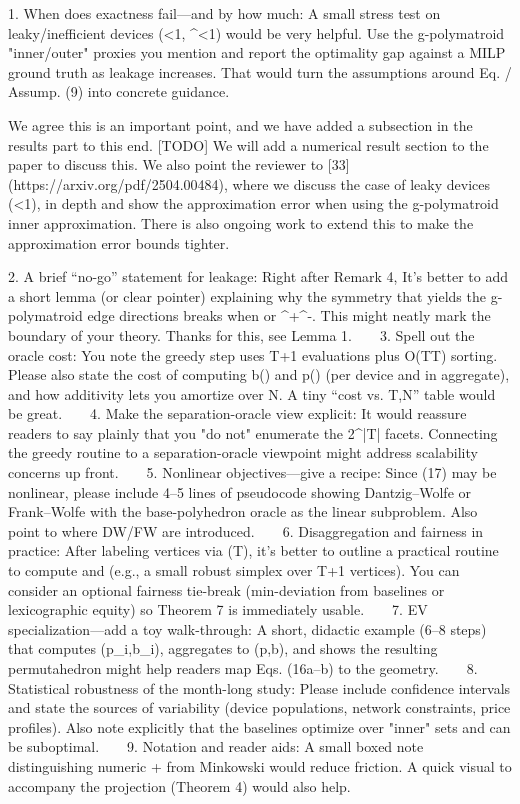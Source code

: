 1. When does exactness fail—and by how much: A small stress test on leaky/inefficient devices (\lambda<1, \eta^\pm<1) would be very helpful. Use the g-polymatroid "inner/outer" proxies you mention and report the optimality gap against a MILP ground truth as leakage increases. That would turn the assumptions around Eq. / Assump. (9) into concrete guidance.

We agree this is an important point, and we have added a subsection in the results part to this end. 
[TODO] We will add a numerical result section to the paper to discuss this.
We also point the reviewer to [33] (https://arxiv.org/pdf/2504.00484), where we discuss the case of leaky devices (\lambda<1), in depth and show the approximation error when using the g-polymatroid inner approximation. There is also ongoing work to extend this to make the approximation error bounds tighter.

2. A brief “no-go” statement for leakage: Right after Remark 4, It's better to add a short lemma (or clear pointer) explaining why the symmetry that yields the g-polymatroid edge directions breaks when \lambda{} or \eta^+\neq\eta^-. This might neatly mark the boundary of your theory.
Thanks for this, see Lemma 1.
   
3. Spell out the oracle cost: You note the greedy step uses T{+}1 evaluations plus O(T\log T) sorting. Please also state the cost of computing b(\cdot) and p(\cdot) (per device and in aggregate), and how additivity lets you amortize over N. A tiny “cost vs. T,N” table would be great.
   
4. Make the separation-oracle view explicit: It would reassure readers to say plainly that you "do not" enumerate the 2^{|T|} facets. Connecting the greedy routine to a separation-oracle viewpoint might address scalability concerns up front.
   
5. Nonlinear objectives—give a recipe: Since (17) may be nonlinear, please include 4–5 lines of pseudocode showing Dantzig–Wolfe or Frank–Wolfe with the base-polyhedron oracle as the linear subproblem. Also point to where DW/FW are introduced.
   
6. Disaggregation and fairness in practice: After labeling vertices via (\tilde T), it's better to outline a practical routine to compute \lambda and \Pi (e.g., a small robust simplex over T{+}1 vertices). You can consider an optional fairness tie-break (min-deviation from baselines or lexicographic equity) so Theorem 7 is immediately usable.
   
7. EV specialization—add a toy walk-through: A short, didactic example (6–8 steps) that computes (p_i,b_i), aggregates to (p,b), and shows the resulting permutahedron might help readers map Eqs. (16a–b) to the geometry.
   
8. Statistical robustness of the month-long study: Please include confidence intervals and state the sources of variability (device populations, network constraints, price profiles). Also note explicitly that the baselines optimize over "inner" sets and can be suboptimal.
   
9. Notation and reader aids: A small boxed note distinguishing numeric + from Minkowski \oplus would reduce friction. A quick visual to accompany the projection (Theorem 4) would also help.

